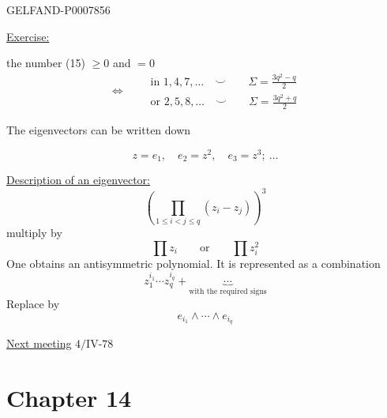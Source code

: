 \begin{GelfandAdjacentEvidence}{GELFAND-P000785}{6}


\underline{Exercise:}

the number (15) \(\geq0\) and \(=0\)
\[
\Longleftrightarrow\quad
\begin{aligned}
&\text{in }1,4,7,\ldots\quad\smile\qquad
\Sigma=\frac{3q^2-q}{2}\\
&\text{or }2,5,8,\ldots\quad\smile\qquad
\Sigma=\frac{3q^2+q}{2}
\end{aligned}
\]
\end{GelfandAdjacentEvidence}


The eigenvectors can be written down

\[
z=e_1,\quad e_2=z^2,\quad e_3=z^3;\ \ldots
\]

\underline{Description of an eigenvector:}
\[
\left(\prod_{1\leq i<j\leq q}(z_i-z_j)\right)^3
\]
multiply by
\[
\prod z_i\qquad\text{or}\qquad\prod z_i^2
\]
One obtains an antisymmetric polynomial. It is represented as a combination
\[
z_1^{i_1}\cdots z_q^{i_q}+\underbrace{\cdots}_{\text{with the required signs}}
\]
Replace by
\[
e_{i_1}\wedge\cdots\wedge e_{i_q}
\]

\underline{Next meeting} \(4/\mathrm{IV}\text{-}78\) 


\clearpage{}
\section*{Chapter 14}


